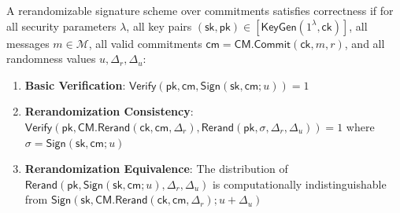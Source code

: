\begin{definition}[Correctness]\label{def:rerandomizable-signature-correctness}
A rerandomizable signature scheme over commitments satisfies correctness if for all security parameters $\lambda$, all key pairs $(\mathsf{sk}, \mathsf{pk}) \in [\mathsf{KeyGen}(1^\lambda, \mathsf{ck})]$, all messages $m \in \mathcal{M}$, all valid commitments $\mathsf{cm} = \mathsf{CM.Commit}(\mathsf{ck}, m, r)$, and all randomness values $u, \Delta_r, \Delta_u$:

\begin{enumerate}
    \item \textbf{Basic Verification}: $\mathsf{Verify}(\mathsf{pk}, \mathsf{cm}, \mathsf{Sign}(\mathsf{sk}, \mathsf{cm}; u)) = 1$
    
    \item \textbf{Rerandomization Consistency}: $\mathsf{Verify}(\mathsf{pk}, \mathsf{CM.Rerand}(\mathsf{ck}, \mathsf{cm}, \Delta_r), \mathsf{Rerand}(\mathsf{pk}, \sigma, \Delta_r, \Delta_u)) = 1$ where $\sigma = \mathsf{Sign}(\mathsf{sk}, \mathsf{cm}; u)$
    
    \item \textbf{Rerandomization Equivalence}: The distribution of $\mathsf{Rerand}(\mathsf{pk}, \mathsf{Sign}(\mathsf{sk}, \mathsf{cm}; u), \Delta_r, \Delta_u)$ is computationally indistinguishable from $\mathsf{Sign}(\mathsf{sk}, \mathsf{CM.Rerand}(\mathsf{ck}, \mathsf{cm}, \Delta_r); u+\Delta_u)$
\end{enumerate}
\end{definition}


